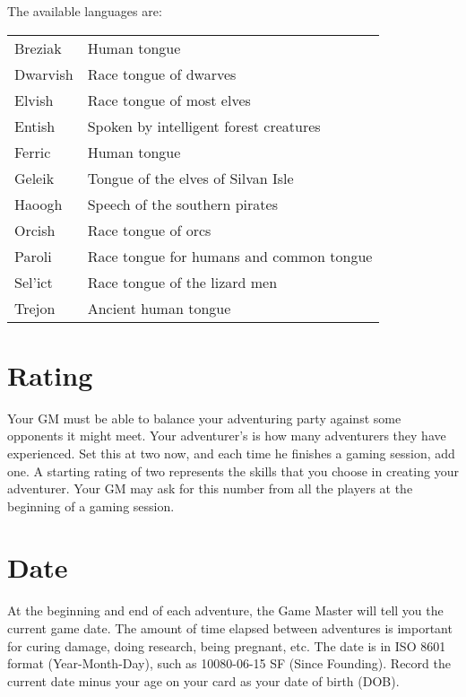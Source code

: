 \begin{multicols*}{2}
The available languages are:
\begin{normbox}[Languages]
\begin{tabularx}{\linewidth}{@{} l X }
\small
Breziak & Human tongue\\
Dwarvish & Race tongue of dwarves\\
Elvish & Race tongue of most elves\\
Entish & Spoken by intelligent forest creatures\\
Ferric & Human tongue\\
Geleik & Tongue of the elves of Silvan Isle\\
Haoogh & Speech of the southern pirates\\
Orcish & Race tongue of orcs\\
Paroli & Race tongue for humans and common tongue\\
Sel'ict & Race tongue of the lizard men\\
Trejon & Ancient human tongue\\
\end{tabularx}
\end{normbox}
\setlength{\columnsep}{0.25cm}
\section{Rating}
Your GM must be able to balance your adventuring party against some opponents it might meet. Your adventurer's  is how many adventurers they have experienced. Set this at two now, and each time he finishes a gaming session, add one. A starting rating of two represents the skills that you choose in creating your adventurer. Your GM may ask for this number from all the players at the beginning of a gaming session.
\section{Date}
At the beginning and end of each adventure, the Game Master will tell you the current game date. The amount of time elapsed between adventures is important for curing damage, doing research, being pregnant, etc. The date is in ISO 8601 format (Year-Month-Day), such as 10080-06-15 SF (Since Founding). Record the current date minus your age on your card as your date of birth (DOB).

\end{multicols*}
